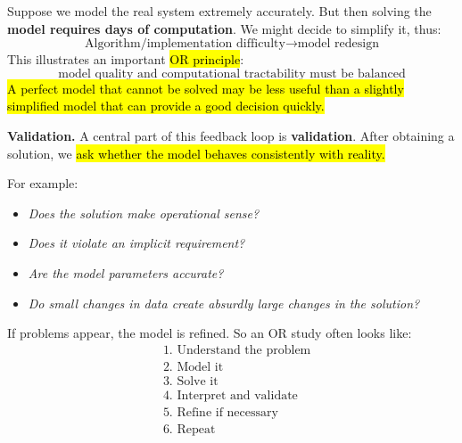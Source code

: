 \highspace
\begin{examplebox}
    Suppose we model the real system extremely accurately. But then solving the \textbf{model requires days of computation}. We might decide to simplify it, thus:
    \begin{equation*}
        \text{Algorithm/implementation difficulty}
        \rightarrow
        \text{model redesign}
    \end{equation*}
    This illustrates an important \hl{OR principle}:
    \begin{equation*}
        \text{model quality and computational tractability must be balanced}
    \end{equation*}
    \hl{A perfect model that cannot be solved may be less useful than a slightly simplified model that can provide a good decision quickly.}
\end{examplebox}

\highspace
\textcolor{Green3}{ \textbf{Validation.}} A central part of this feedback loop is \textbf{validation}. After obtaining a solution, we \hl{ask whether the model behaves consistently with reality.}

\highspace
For example:
\begin{itemize}
    \item \emph{Does the solution make operational sense?}
    \item \emph{Does it violate an implicit requirement?}
    \item \emph{Are the model parameters accurate?}
    \item \emph{Do small changes in data create absurdly large changes in the solution?}
\end{itemize}
If problems appear, the model is refined. So an OR study often looks like:
\begin{equation*}
    \begin{aligned}
        &\text{1. Understand the problem}\\
        &\text{2. Model it}\\
        &\text{3. Solve it}\\
        &\text{4. Interpret and validate}\\
        &\text{5. Refine if necessary}\\
        &\text{6. Repeat}
    \end{aligned}
\end{equation*}

